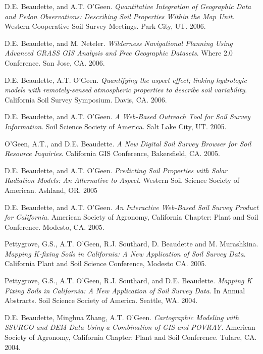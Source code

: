 \documentclass[overlapped,line,10pt,letterpaper]{res}
\begin{document}
\begin{resume}
D.E. Beaudette, and A.T. O'Geen. {\em Quantitative Integration of Geographic Data and Pedon Observations: Describing Soil Properties Within the Map Unit}. Western Cooperative Soil Survey Meetings. Park City, UT. 2006.

D.E. Beaudette, and M. Neteler. {\em Wilderness Navigational Planning Using Advanced GRASS GIS Analysis and Free Geographic Datasets}. Where 2.0 Conference. San Jose, CA. 2006.

D.E. Beaudette, A.T. O'Geen. {\em Quantifying the aspect effect; linking hydrologic models with remotely-sensed  atmospheric properties to describe soil variability}. California Soil Survey Symposium. Davis, CA. 2006.

D.E. Beaudette, and A.T. O'Geen. {\em A Web-Based Outreach Tool for Soil Survey Information}. Soil Science Society of America. Salt Lake City, UT. 2005.

O'Geen, A.T., and D.E. Beaudette. {\em A New Digital Soil Survey Browser for Soil Resource Inquiries}. California GIS Conference, Bakersfield, CA. 2005.

D.E. Beaudette, and A.T. O'Geen. {\em Predicting Soil Properties with Solar Radiation Models: An Alternative to Aspect}. Western Soil Science Society of American. Ashland, OR. 2005

D.E. Beaudette, and A.T. O'Geen. {\em An Interactive Web-Based Soil Survey Product for California}. American Society of Agronomy, California Chapter: Plant and Soil Conference. Modesto, CA. 2005.

Pettygrove, G.S.,  A.T. O'Geen, R.J. Southard, D. Beaudette and M. Murashkina. {\em Mapping K-fixing Soils in California: A New Application of Soil Survey Data}. California Plant and Soil Science Conference, Modesto CA. 2005.

Pettygrove, G.S., A.T. O'Geen, R.J. Southard, and D.E. Beaudette. {\em Mapping K Fixing Soils in California: A New Application of Soil Survey Data}. In Annual Abstracts. Soil Science Society of America. Seattle, WA. 2004.

D.E. Beaudette, Minghua Zhang, A.T. O'Geen. {\em Cartographic Modeling with SSURGO and DEM Data Using a Combination of GIS and POVRAY}. American Society of Agronomy, California Chapter: Plant and Soil Conference. Tulare, CA. 2004.


\end{resume}
\end{document}
